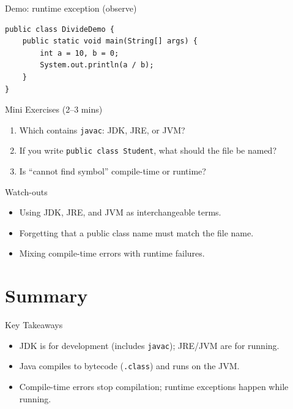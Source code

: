 \documentclass{beamer}
\begin{document}
\begin{frame}[fragile]{Demo: runtime exception (observe)}
\begin{lstlisting}
public class DivideDemo {
    public static void main(String[] args) {
        int a = 10, b = 0;
        System.out.println(a / b);
    }
}
\end{lstlisting}
  \slidesources{\OOPSUnitISources}
\end{frame}

\begin{frame}{Mini Exercises (2--3 mins)}
  \begin{enumerate}[<+->]
    \item Which contains \texttt{javac}: JDK, JRE, or JVM?
    \item If you write \texttt{public class Student}, what should the file be named?
    \item Is ``cannot find symbol'' compile-time or runtime?
  \end{enumerate}
  \slidesources{\OOPSUnitISources}
\end{frame}

\begin{frame}{Watch-outs}
\begin{itemize}[<+->]
  \item Using JDK, JRE, and JVM as interchangeable terms.
  \item Forgetting that a public class name must match the file name.
  \item Mixing compile-time errors with runtime failures.
\end{itemize}
  \slidesources{\OOPSUnitISources}
\end{frame}

\section{Summary}
\label{sec:summary}

\begin{frame}{Key Takeaways}
  \begin{itemize}[<+->]
    \item JDK is for development (includes \texttt{javac}); JRE/JVM are for running.
    \item Java compiles to bytecode (\texttt{.class}) and runs on the JVM.
    \item Compile-time errors stop compilation; runtime exceptions happen while running.
  \end{itemize}
  \slidesources{\OOPSUnitISources}
\end{frame}
\end{document}
